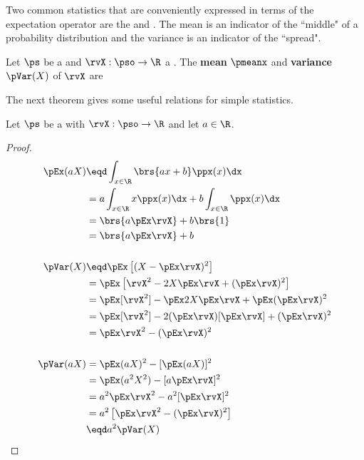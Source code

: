 Two common statistics that are conveniently expressed in terms of the
expectation operator are the  and .
The mean is an indicator of the ``middle" of a probability distribution and the
variance is an indicator of the ``spread".
\begin{definition}
\label{def:Mx}
Let $\ps$ be a  and $\rvX:\pso\to\R$ a .
The {\bf mean} $\pmeanx$ and {\bf variance} $\pVar(X)$ of $\rvX$ are
\end{definition}

The next theorem gives some useful relations for simple statistics.
\begin{theorem}
\label{thm:pE}
Let $\ps$ be a  with  $\rvX:\pso\to\R$
and let $a\in\R$.
\end{theorem}
\begin{proof}
\begin{align*}
  \pEx(aX)
    &\eqd \int_{x\in\R}\brs{ax+b} \ppx(x)  \dx
  \\&=    a \int_{x\in\R}x \ppx(x)  \dx + b\int_{x\in\R}\ppx(x)  \dx
  \\&= \brs{a\pEx\rvX} + b\brs{1}
  \\&= \brs{a\pEx\rvX} + b
\\
\\
  \pVar(X)
    &\eqd \pEx\left[(X-\pEx\rvX)^2\right]
  \\&=    \pEx\left[\rvX^2-2X\pEx\rvX + (\pEx\rvX)^2 \right]
  \\&=    \pEx[\rvX^2]  - \pEx 2X\pEx\rvX  + \pEx (\pEx\rvX)^2
  \\&=    \pEx[\rvX^2] - 2(\pEx\rvX)[\pEx\rvX] + (\pEx\rvX)^2
  \\&=    \pEx\rvX^2  - (\pEx\rvX)^2
\\
\\
  \pVar(aX)
    &=    \pEx(aX)^2  - [\pEx(aX)]^2
  \\&=    \pEx(a^2X^2)  - [a\pEx\rvX]^2
  \\&=    a^2 \pEx\rvX^2  - a^2[\pEx\rvX]^2
  \\&=    a^2\left[ \pEx\rvX^2  - (\pEx\rvX)^2 \right]
  \\&\eqd a^2 \pVar(X)
\end{align*}
\end{proof}


